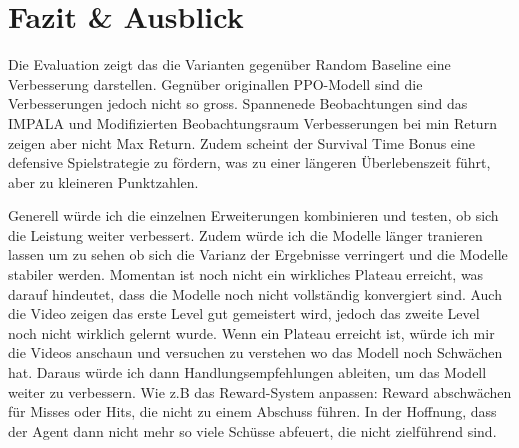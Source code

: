 \documentclass{article}
\begin{document}
\section{Fazit \& Ausblick}

Die Evaluation zeigt das die Varianten gegenüber Random Baseline eine Verbesserung darstellen. Gegnüber originallen PPO-Modell sind die Verbesserungen jedoch nicht so gross.
Spannenede Beobachtungen sind das IMPALA und Modifizierten Beobachtungsraum Verbesserungen bei min Return zeigen aber nicht Max Return.
Zudem scheint der Survival Time Bonus eine defensive Spielstrategie zu fördern, was zu einer längeren Überlebenszeit führt, aber zu kleineren Punktzahlen.
\newline

Generell würde ich die einzelnen Erweiterungen kombinieren und testen, ob sich die Leistung weiter verbessert. 
Zudem würde ich die Modelle länger tranieren lassen um zu sehen ob sich die Varianz der Ergebnisse verringert und die Modelle stabiler werden. Momentan ist noch nicht ein wirkliches Plateau erreicht, was darauf hindeutet, dass die Modelle noch nicht vollständig konvergiert sind.
Auch die Video zeigen das erste Level gut gemeistert wird, jedoch das zweite Level noch nicht wirklich gelernt wurde.
Wenn ein Plateau erreicht ist, würde ich mir die Videos anschaun und versuchen zu verstehen wo das Modell noch Schwächen hat. Daraus würde ich dann Handlungsempfehlungen ableiten, um das Modell weiter zu verbessern.
Wie z.B das Reward-System anpassen: Reward abschwächen für Misses oder Hits, die nicht zu einem Abschuss führen. In der Hoffnung, dass der Agent dann nicht mehr so viele Schüsse abfeuert, die nicht zielführend sind.
\end{document}

